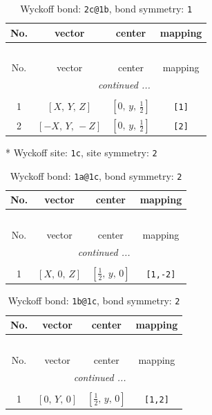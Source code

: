 \documentclass[fleqn,8pt]{jsarticle}
\begin{document}
\renewcommand{\arraystretch}{1.2}
\begin{longtable}{cccc}
\caption{Wyckoff bond: {\tt 2c@1b}, bond symmetry: {\tt 1}}
 \\
 \hline \hline
No. & vector & center & mapping \\ \hline \endfirsthead

\multicolumn{3}{l}{\tablename\ \thetable{}} \\
 \hline \hline
No. & vector & center & mapping \\ \hline \endhead

 \hline \hline
\multicolumn{3}{r}{\footnotesize\it continued ...} \\ \endfoot

 \hline \hline
\multicolumn{3}{r}{} \\ \endlastfoot

1 & $\left[ X,\, Y,\, Z \right]$ & $\left[ 0,\, y,\, \frac{1}{2} \right]$ & {\tt [1]} \\ \hline
2 & $\left[ - X,\, Y,\, - Z \right]$ & $\left[ 0,\, y,\, \frac{1}{2} \right]$ & {\tt [2]} \\
\end{longtable}
* Wyckoff site: {\tt 1c}, site symmetry: {\tt 2}
\renewcommand{\arraystretch}{1.2}
\begin{longtable}{cccc}
\caption{Wyckoff bond: {\tt 1a@1c}, bond symmetry: {\tt 2}}
 \\
 \hline \hline
No. & vector & center & mapping \\ \hline \endfirsthead

\multicolumn{3}{l}{\tablename\ \thetable{}} \\
 \hline \hline
No. & vector & center & mapping \\ \hline \endhead

 \hline \hline
\multicolumn{3}{r}{\footnotesize\it continued ...} \\ \endfoot

 \hline \hline
\multicolumn{3}{r}{} \\ \endlastfoot

1 & $\left[ X,\, 0,\, Z \right]$ & $\left[ \frac{1}{2},\, y,\, 0 \right]$ & {\tt [1,-2]} \\
\end{longtable}
\renewcommand{\arraystretch}{1.2}
\begin{longtable}{cccc}
\caption{Wyckoff bond: {\tt 1b@1c}, bond symmetry: {\tt 2}}
 \\
 \hline \hline
No. & vector & center & mapping \\ \hline \endfirsthead

\multicolumn{3}{l}{\tablename\ \thetable{}} \\
 \hline \hline
No. & vector & center & mapping \\ \hline \endhead

 \hline \hline
\multicolumn{3}{r}{\footnotesize\it continued ...} \\ \endfoot

 \hline \hline
\multicolumn{3}{r}{} \\ \endlastfoot

1 & $\left[ 0,\, Y,\, 0 \right]$ & $\left[ \frac{1}{2},\, y,\, 0 \right]$ & {\tt [1,2]} \\
\end{longtable}
\end{document}
